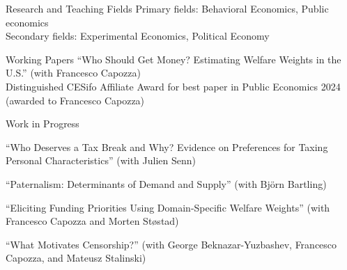 \documentclass{resume} %
\begin{document}
\begin{rSection}{Research and Teaching Fields}
  Primary fields: Behavioral Economics, Public economics \\
  Secondary fields: Experimental Economics, Political Economy
\end{rSection}

\begin{rSection}{Working Papers}
    ``Who Should Get Money? Estimating Welfare Weights in the U.S.'' (with Francesco Capozza) \\ \vspace{0.1em}
    { \normalsize  \hspace*{1em} Distinguished CESifo Affiliate Award for best paper in Public Economics 2024 (awarded to \hspace*{2em} Francesco Capozza)}

  \end{rSection}

\begin{rSection}{Work in Progress}

  ``Who Deserves a Tax Break and Why? Evidence on
   Preferences for Taxing Personal Characteristics'' (with Julien Senn)

  ``Paternalism: Determinants of Demand and Supply'' (with Bj\"{o}rn Bartling)

  ``Eliciting Funding Priorities Using Domain-Specific Welfare Weights'' (with Francesco Capozza and Morten St{\o}stad)

  ``What Motivates Censorship?'' (with George Beknazar-Yuzbashev, Francesco Capozza, and Mateusz Stalinski)
\end{rSection}
\end{document}
